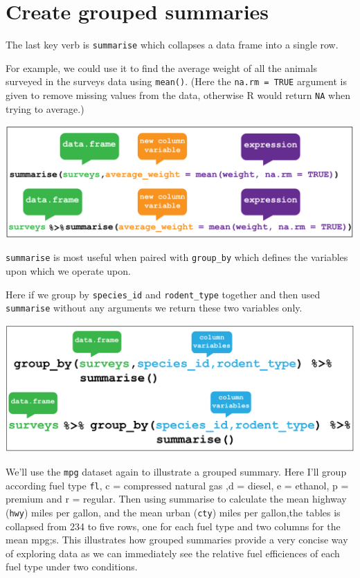 \documentclass[12pt,]{book}
\theoremstyle{definition}
\theoremstyle{definition}
\theoremstyle{definition}
\theoremstyle{remark}
\begin{document}
\section{Create grouped summaries}\label{create-grouped-summaries}

The last key verb is \texttt{summarise} which collapses a data frame
into a single row.

For example, we could use it to find the average weight of all the
animals surveyed in the surveys data using \texttt{mean()}. (Here the
\texttt{na.rm\ =\ TRUE} argument is given to remove missing values from
the data, otherwise R would return \texttt{NA} when trying to average.)

\begin{center}\includegraphics[width=0.8\linewidth]{img/dplyr_summarise} \end{center}

\texttt{summarise} is most useful when paired with \texttt{group\_by}
which defines the variables upon which we operate upon.

Here if we group by \texttt{species\_id} and \texttt{rodent\_type}
together and then used \texttt{summarise} without any arguments we
return these two variables only.

\begin{center}\includegraphics[width=0.8\linewidth]{img/dplyr_group_by} \end{center}

We'll use the \texttt{mpg} dataset again to illustrate a grouped
summary. Here I'll group according fuel type \texttt{fl}, c = compressed
natural gas ,d = diesel, e = ethanol, p = premium and r = regular. Then
using summarise to calculate the mean highway (\texttt{hwy}) miles per
gallon, and the mean urban (\texttt{cty}) miles per gallon,the tables is
collapsed from 234 to five rows, one for each fuel type and two columns
for the mean mpg;s. This illustrates how grouped summaries provide a
very concise way of exploring data as we can immediately see the
relative fuel efficiences of each fuel type under two conditions.
\end{document}
